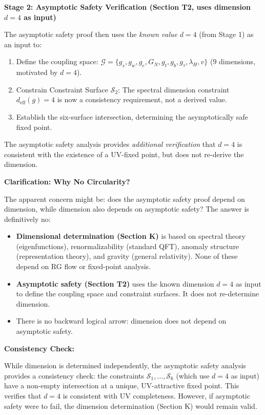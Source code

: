 {\begin{remark}
\textbf{Stage 2: Asymptotic Safety Verification (Section T2, uses dimension $d = 4$ as input)}

The asymptotic safety proof then uses the \emph{known value} $d = 4$ (from Stage 1) as an input to:

\begin{enumerate}
\item Define the coupling space: $\mathcal{G} = \{g_s, g_w, g_e, G_N, g_t, g_b, g_\tau, \lambda_H, v\}$ (9 dimensions, motivated by $d = 4$).
\item Constrain Constraint Surface $\mathcal{S}_2$: The spectral dimension constraint $d_{\text{eff}}(g) = 4$ is now a consistency requirement, not a derived value.
\item Establish the six-surface intersection, determining the asymptotically safe fixed point.
\end{enumerate}

The asymptotic safety analysis provides \emph{additional verification} that $d = 4$ is consistent with the existence of a UV-fixed point, but does not re-derive the dimension.

\textbf{Clarification: Why No Circularity?}

The apparent concern might be: does the asymptotic safety proof depend on dimension, while dimension also depends on asymptotic safety? The answer is definitively no:

\begin{itemize}
\item \textbf{Dimensional determination (Section K)} is based on spectral theory (eigenfunctions), renormalizability (standard QFT), anomaly structure (representation theory), and gravity (general relativity). None of these depend on RG flow or fixed-point analysis.
\item \textbf{Asymptotic safety (Section T2)} uses the known dimension $d = 4$ as input to define the coupling space and constraint surfaces. It does not re-determine dimension.
\item There is no backward logical arrow: dimension does not depend on asymptotic safety.
\end{itemize}

\textbf{Consistency Check:}

While dimension is determined independently, the asymptotic safety analysis provides a consistency check: the constraints $\mathcal{S}_1, \ldots, \mathcal{S}_6$ (which use $d = 4$ as input) have a non-empty intersection at a unique, UV-attractive fixed point. This verifies that $d = 4$ is consistent with UV completeness. However, if asymptotic safety were to fail, the dimension determination (Section K) would remain valid.


\end{remark}}

